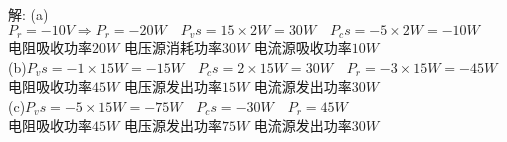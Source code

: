 \documentclass{article}
\begin{document}
\noindent 解:
(a)$P_r=-10V\Rightarrow P_r=-20W\quad
P_vs=15\times2W=30W\quad
P_cs=-5\times2W=-10W$\\电阻吸收功率$20W$
电压源消耗功率$30W$
电流源吸收功率$10W$\\
(b)$P_vs=-1\times15W=-15W\quad
P_cs=2\times15W=30W\quad
P_r=-3\times15W=-45W$\\电阻吸收功率$45W$
电压源发出功率$15W$
电流源发出功率$30W$\\
(c)$P_vs=-5\times15W=-75W\quad
P_cs=-30W\quad
P_r=45W$\\电阻吸收功率$45W$
电压源发出功率$75W$
电流源发出功率$30W$
\end{document}
